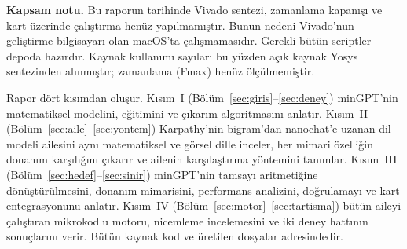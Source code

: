 \begin{uyari}
\textbf{Kapsam notu.} Bu raporun tarihinde Vivado sentezi, zamanlama kapanışı ve kart üzerinde çalıştırma henüz yapılmamıştır. Bunun nedeni Vivado'nun geliştirme bilgisayarı olan macOS'ta çalışmamasıdır. Gerekli bütün scriptler depoda hazırdır. Kaynak kullanımı sayıları bu yüzden açık kaynak Yosys sentezinden alınmıştır; zamanlama (Fmax) henüz ölçülmemiştir.
\end{uyari}

Rapor dört kısımdan oluşur. Kısım~I (Bölüm~\ref{sec:giris}--\ref{sec:deney}) minGPT'nin matematiksel modelini, eğitimini ve çıkarım algoritmasını anlatır. Kısım~II (Bölüm~\ref{sec:aile}--\ref{sec:yontem}) Karpathy'nin bigram'dan nanochat'e uzanan dil modeli ailesini aynı matematiksel ve görsel dille inceler, her mimari özelliğin donanım karşılığını çıkarır ve ailenin karşılaştırma yöntemini tanımlar. Kısım~III (Bölüm~\ref{sec:hedef}--\ref{sec:sinir}) minGPT'nin tamsayı aritmetiğine dönüştürülmesini, donanım mimarisini, performans analizini, doğrulamayı ve kart entegrasyonunu anlatır. Kısım~IV (Bölüm~\ref{sec:motor}--\ref{sec:tartisma}) bütün aileyi çalıştıran mikrokodlu motoru, nicemleme incelemesini ve iki deney hattının sonuçlarını verir. Bütün kaynak kod ve üretilen dosyalar \gh{} adresindedir.
